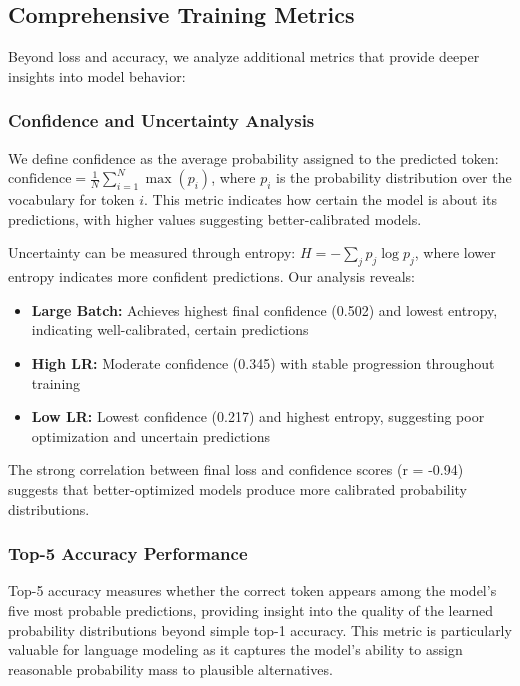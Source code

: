 \documentclass[11pt,a4paper]{article}
\begin{document}
\subsection{Comprehensive Training Metrics}
Beyond loss and accuracy, we analyze additional metrics that provide deeper insights into model behavior:

\subsubsection{Confidence and Uncertainty Analysis}
We define confidence as the average probability assigned to the predicted token: $\text{confidence} = \frac{1}{N} \sum_{i=1}^{N} \max(p_i)$, where $p_i$ is the probability distribution over the vocabulary for token $i$. This metric indicates how certain the model is about its predictions, with higher values suggesting better-calibrated models.

Uncertainty can be measured through entropy: $H = -\sum_{j} p_j \log p_j$, where lower entropy indicates more confident predictions. Our analysis reveals:

\begin{itemize}
    \item \textbf{Large Batch:} Achieves highest final confidence (0.502) and lowest entropy, indicating well-calibrated, certain predictions
    \item \textbf{High LR:} Moderate confidence (0.345) with stable progression throughout training
    \item \textbf{Low LR:} Lowest confidence (0.217) and highest entropy, suggesting poor optimization and uncertain predictions
\end{itemize}

The strong correlation between final loss and confidence scores (r = -0.94) suggests that better-optimized models produce more calibrated probability distributions.

\subsubsection{Top-5 Accuracy Performance}
Top-5 accuracy measures whether the correct token appears among the model's five most probable predictions, providing insight into the quality of the learned probability distributions beyond simple top-1 accuracy. This metric is particularly valuable for language modeling as it captures the model's ability to assign reasonable probability mass to plausible alternatives.
\end{document}
